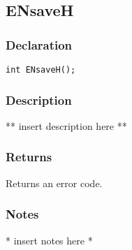 \subsection{ENsaveH}
\subsubsection{Declaration}
\begin{lstlisting}
int ENsaveH();
\end{lstlisting}
\subsubsection{Description}
** insert description here **
\subsubsection{Returns}
Returns an error code.
\subsubsection{Notes}
* insert notes here *
